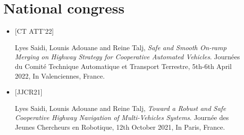 \section*{National congress}

\begin{itemize}
    \item \hypertarget{CTATT22}{[CT ATT’22]} Lyes Saidi, Lounis Adouane and Reine Talj, \textit{Safe and Smooth On-ramp Merging on Highway Strategy for Cooperative Automated Vehicles}. Journées du Comité Technique Automatique et Transport Terrestre, 5th-6th April 2022, In Valenciennes, France. 

    \item \hypertarget{JJCR21}{[JJCR21]} Lyes Saidi, Lounis Adouane and Reine Talj, \textit{Toward a Robust and Safe Cooperative Highway Navigation of Multi-Vehicles Systems}. Journée des Jeunes Chercheurs en Robotique, 12th October 2021, In Paris, France.
\end{itemize}



